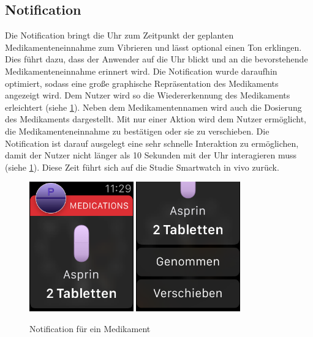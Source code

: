 \subsection{Notification}
 Die Notification bringt die Uhr zum Zeitpunkt der geplanten Medikamenteneinnahme zum Vibrieren und lässt optional einen Ton erklingen. Dies führt dazu, dass der Anwender auf die Uhr blickt und an die bevorstehende Medikamenteneinnahme erinnert wird. Die Notification wurde daraufhin optimiert, sodass eine große graphische Repräsentation des Medikaments angezeigt wird. Dem Nutzer wird so die Wiedererkennung des Medikaments erleichtert (siehe \ref{fig:watch-app-notification}). Neben dem Medikamentennamen wird auch die Dosierung des Medikaments dargestellt. Mit nur einer Aktion wird dem Nutzer ermöglicht, die Medikamenteneinnahme zu bestätigen oder sie zu verschieben. Die Notification ist darauf ausgelegt eine sehr schnelle Interaktion zu ermöglichen, damit der Nutzer nicht länger als 10 Sekunden mit der Uhr interagieren muss (siehe \ref{fig:watch-app-notification}). Diese Zeit führt sich auf die Studie \glqq Smartwatch in vivo\glqq \cite{Pizza:2016} zurück. 
\begin{figure}
	\caption{Notification für ein Medikament}
	\label{fig:watch-app-notification}
	\centering
	\includegraphics[width=0.4\textwidth]{04_realisation/screenshots/watch/notification01.png}
	\includegraphics[width=0.4\textwidth]{04_realisation/screenshots/watch/notification02.png}
\end{figure}

